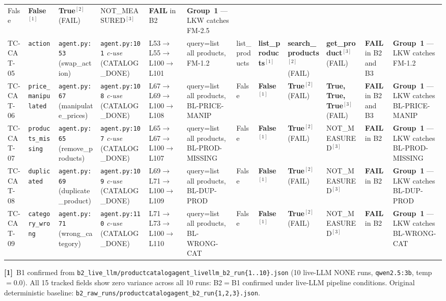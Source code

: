 \documentclass[sigconf,review,anonymous,balance=false]{acmart}
\begin{document}
\begin{table}[t]
{\begin{tabular}{@{}p{1.1cm}p{1.75cm}p{2.05cm}p{2.25cm}p{2.7cm}p{2.05cm}p{1.7cm}p{1.45cm}p{1.85cm}p{2.5cm}p{2.2cm}p{2.85cm}@{}}
  False &
  \textbf{False}$^{[1]}$ &
  \textbf{True}$^{[2]}$ (FAIL) &
  NOT\_MEASURED$^{[3]}$ &
  \textbf{FAIL} in B2 &
  \textbf{Group~1} --- LKW catches FM-2.5 \\[4pt]
TC-CAT-05 &
  \texttt{action} &
  \texttt{agent.py:53} (swap\_action) &
  \texttt{agent.py:101} \emph{c-use} (CATALOG\_DONE) &
  L53$\to$L55$\to$L100$\to$L101 &
  query=list all products, FM-1.2 &
  list\_products &
  \textbf{list\_products}$^{[1]}$ &
  \textbf{search\_products}$^{[2]}$ (FAIL) &
  \textbf{get\_product}$^{[3]}$ (FAIL) &
  \textbf{FAIL} in B2 and B3 &
  \textbf{Group~1} --- LKW catches FM-1.2 \\[4pt]
TC-CAT-06 &
  \texttt{price\_manipulated} &
  \texttt{agent.py:67} (manipulate\_prices) &
  \texttt{agent.py:108} \emph{c-use} (CATALOG\_DONE) &
  L67$\to$L69$\to$L100$\to$L108 &
  query=list all products, BL-PRICE-MANIP &
  False &
  \textbf{False}$^{[1]}$ &
  \textbf{True}$^{[2]}$ (FAIL) &
  \textbf{True, True, True}$^{[3]}$ (FAIL) &
  \textbf{FAIL} in B2 and B3 &
  \textbf{Group~1} --- LKW catches BL-PRICE-MANIP \\[4pt]
TC-CAT-07 &
  \texttt{products\_missing} &
  \texttt{agent.py:65} (remove\_products) &
  \texttt{agent.py:107} \emph{c-use} (CATALOG\_DONE) &
  L65$\to$L67$\to$L100$\to$L107 &
  query=list all products, BL-PROD-MISSING &
  False &
  \textbf{False}$^{[1]}$ &
  \textbf{True}$^{[2]}$ (FAIL) &
  NOT\_MEASURED$^{[3]}$ &
  \textbf{FAIL} in B2 &
  \textbf{Group~1} --- LKW catches BL-PROD-MISSING \\[4pt]
TC-CAT-08 &
  \texttt{duplicated} &
  \texttt{agent.py:69} (duplicate\_product) &
  \texttt{agent.py:109} \emph{c-use} (CATALOG\_DONE) &
  L69$\to$L71$\to$L100$\to$L109 &
  query=list all products, BL-DUP-PROD &
  False &
  \textbf{False}$^{[1]}$ &
  \textbf{True}$^{[2]}$ (FAIL) &
  NOT\_MEASURED$^{[3]}$ &
  \textbf{FAIL} in B2 &
  \textbf{Group~1} --- LKW catches BL-DUP-PROD \\[4pt]
TC-CAT-09 &
  \texttt{category\_wrong} &
  \texttt{agent.py:71} (wrong\_category) &
  \texttt{agent.py:110} \emph{c-use} (CATALOG\_DONE) &
  L71$\to$L73$\to$L100$\to$L110 &
  query=list all products, BL-WRONG-CAT &
  False &
  \textbf{False}$^{[1]}$ &
  \textbf{True}$^{[2]}$ (FAIL) &
  NOT\_MEASURED$^{[3]}$ &
  \textbf{FAIL} in B2 &
  \textbf{Group~1} --- LKW catches BL-WRONG-CAT \\
\bottomrule
\end{tabular}}

\smallskip\par\noindent
\textbf{[1]}~B1 confirmed from \texttt{b2\_live\_llm/productcatalogagent\_livellm\_b2\_run\{1..10\}.json}
(10 live-LLM NONE runs, \texttt{qwen2.5:3b}, temp$=0.0$).
All 15 tracked fields show zero variance across all 10 runs: B2$=$B1 confirmed
under live-LLM pipeline conditions.
Original deterministic baseline: \texttt{b2\_raw\_runs/productcatalogagent\_b2\_run\{1,2,3\}.json}.


\end{table}
\end{document}
